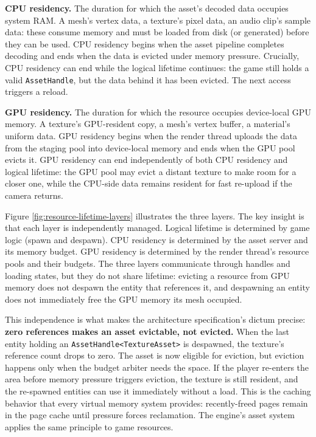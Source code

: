 \documentclass[
  11pt,
  letterpaper,
  DIV=11,
  numbers=noendperiod,
  twoside,
  open=right]{scrreprt}
\begin{document}
\textbf{CPU residency.} The duration for which the asset's decoded data
occupies system RAM. A mesh's vertex data, a texture's pixel data, an
audio clip's sample data: these consume memory and must be loaded from
disk (or generated) before they can be used. CPU residency begins when
the asset pipeline completes decoding and ends when the data is evicted
under memory pressure. Crucially, CPU residency can end while the
logical lifetime continues: the game still holds a valid
\texttt{AssetHandle}, but the data behind it has been evicted. The next
access triggers a reload.

\textbf{GPU residency.} The duration for which the resource occupies
device-local GPU memory. A texture's GPU-resident copy, a mesh's vertex
buffer, a material's uniform data. GPU residency begins when the render
thread uploads the data from the staging pool into device-local memory
and ends when the GPU pool evicts it. GPU residency can end
independently of both CPU residency and logical lifetime: the GPU pool
may evict a distant texture to make room for a closer one, while the
CPU-side data remains resident for fast re-upload if the camera returns.

Figure \ref{fig:resource-lifetime-layers} illustrates the three layers.
The key insight is that each layer is independently managed. Logical
lifetime is determined by game logic (spawn and despawn). CPU residency
is determined by the asset server and its memory budget. GPU residency
is determined by the render thread's resource pools and their budgets.
The three layers communicate through handles and loading states, but
they do not share lifetime: evicting a resource from GPU memory does not
despawn the entity that references it, and despawning an entity does not
immediately free the GPU memory its mesh occupied.



This independence is what makes the architecture specification's dictum
precise: \textbf{zero references makes an asset evictable, not evicted.}
When the last entity holding an
\texttt{AssetHandle\textless{}TextureAsset\textgreater{}} is despawned,
the texture's reference count drops to zero. The asset is now eligible
for eviction, but eviction happens only when the budget arbiter needs
the space. If the player re-enters the area before memory pressure
triggers eviction, the texture is still resident, and the re-spawned
entities can use it immediately without a load. This is the caching
behavior that every virtual memory system provides: recently-freed pages
remain in the page cache until pressure forces reclamation. The engine's
asset system applies the same principle to game resources.
\end{document}
